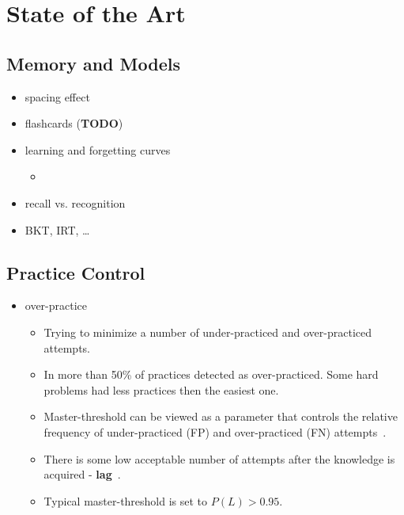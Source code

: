\documentclass[table,color]{fithesis3/fithesis3}
\begin{document}
\chapter{State of the Art}

\section{Memory and Models}

\begin{itemize}
	\item spacing effect~\cite{ostrow2015blocking,maass2015how,kornell2008learning,kornell2010spacing}
	\item flashcards (\textbf{TODO})~\cite{kornell2014focusing,bjork2013self,kornell2008optimising,kornell2009optimising}
	\item learning and forgetting curves~\cite{streeter2015mixture}
		\begin{itemize}
			\item ~
		\end{itemize}
	\item recall vs. recognition
	\item BKT, IRT, \ldots
\end{itemize}

\section{Practice Control}

\begin{itemize}
	\item over-practice
		\begin{itemize}
			\item Trying to minimize a number of under-practiced and over-practiced attempts.
			\item In \cite{cen2007over} more than 50\% of practices detected as
				over-practiced. Some hard problems had less practices then the easiest
				one.
			\item Master-threshold can be viewed as a parameter that controls the
				relative frequency of under-practiced (FP) and over-practiced (FN)
				attempts~\cite{fancsali2013optimal}.
			\item There is some low acceptable number of attempts after the knowledge
				is acquired - \textbf{lag}~\cite{fancsali2013optimal}.
			\item Typical master-threshold is set to $P(L) > 0.95$.
		\end{itemize}
\end{itemize}
\end{document}

